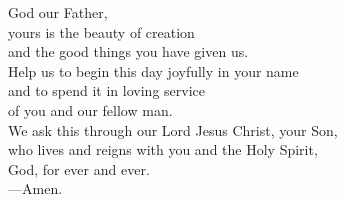 \prayer


\begin{prayerverse}
God our Father,\\
yours is the beauty of creation\\
and the good things you have given us.\\
Help us to begin this day joyfully in your name\\
and to spend it in loving service\\
of you and our fellow man.\\
We ask this through our Lord Jesus Christ, your Son,\\
who lives and reigns with you and the Holy Spirit,\\
God, for ever and ever.\\
{\color{red}---\thinspace}Amen.
\end{prayerverse}

